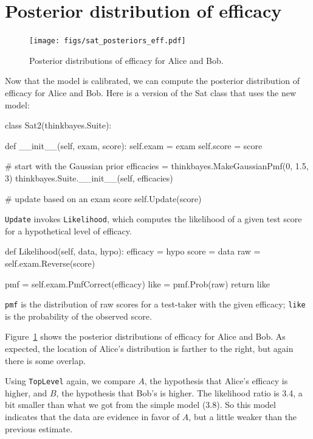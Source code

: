 \documentclass[12pt]{book}
\theoremstyle{exercise}
\begin{document}
\section{Posterior distribution of efficacy}

\begin{figure}
\centerline{\texttt{[image: figs/sat\_posteriors\_eff.pdf]}}
\caption{Posterior distributions of efficacy for Alice and Bob.}
\label{fig.satposterior2}
\end{figure}

Now that the model is calibrated, we can compute the posterior
distribution of efficacy for Alice and Bob.  Here is a version of the
Sat class that uses the new model:

\begin{code}
class Sat2(thinkbayes.Suite):

    def __init__(self, exam, score):
        self.exam = exam
        self.score = score

        # start with the Gaussian prior
        efficacies = thinkbayes.MakeGaussianPmf(0, 1.5, 3)
        thinkbayes.Suite.__init__(self, efficacies)

        # update based on an exam score
        self.Update(score)
\end{code}

\verb"Update" invokes
\verb"Likelihood", which computes the likelihood of a given test score
for a hypothetical level of efficacy.

\begin{code}
    def Likelihood(self, data, hypo):
        efficacy = hypo
        score = data
        raw = self.exam.Reverse(score)

        pmf = self.exam.PmfCorrect(efficacy)
        like = pmf.Prob(raw)
        return like
\end{code}

{\tt pmf} is the distribution of raw scores for a test-taker
with the given efficacy; {\tt like} is the probability of
the observed score.

Figure~\ref{fig.satposterior2} shows the posterior distributions
of efficacy for Alice and Bob.  As expected, the location
of Alice's distribution is farther to the right, but again there
is some overlap.

Using {\tt TopLevel} again, we compare $A$, the
hypothesis that Alice's efficacy is higher, and $B$, the
hypothesis that Bob's is higher.  The likelihood ratio is
3.4, a bit smaller than what we got from the simple model (3.8).
So this model indicates that the data are evidence in favor
of $A$, but a little weaker than the previous estimate.
\end{document}
